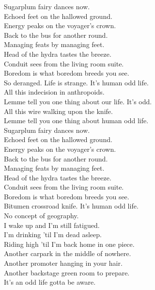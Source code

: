 Sugarplum fairy dances now. \\
Echoed feet on the hallowed ground. \\
Energy peaks on the voyager's crown. \\
Back to the bus for another round. \\
Managing feats by managing feet. \\
Head of the hydra tastes the breeze. \\
Conduit sees from the living room suite. \\
Boredom is what boredom breeds you see. \\

So deranged. Life is strange. It's human odd life. \\

All this indecision in anthropoids. \\
Lemme tell you one thing about our life. It's odd. \\
All this wire walking upon the knife. \\
Lemme tell you one thing about human odd life. \\

Sugarplum fairy dances now. \\
Echoed feet on the hallowed ground. \\
Energy peaks on the voyager's crown. \\
Back to the bus for another round. \\
Managing feats by managing feet. \\
Head of the hydra tastes the breeze. \\
Conduit sees from the living room suite. \\
Boredom is what boredom breeds you see. \\

Bitumen crossroad knife. It's human odd life. \\

No concept of geography. \\
I wake up and I'm still fatigued. \\
I'm drinking 'til I'm dead asleep. \\
Riding high 'til I'm back home in one piece. \\
Another carpark in the middle of nowhere. \\
Another promoter hanging in your hair. \\
Another backstage green room to prepare. \\
It's an odd life gotta be aware. \\

